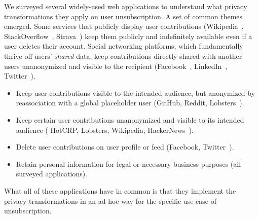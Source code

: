 %
We surveyed several widely-used web applications to understand what privacy transformations they apply on user unsubscription.
%
A set of common themes emerged.
%
Some services that publicly display user contributions (\eg Wikipedia~\cite{wikipedia:privacy},
StackOverflow~\cite{stackoverflow:privacy}, Strava~\cite{strava:privacy}) keep them publicly
and indefinitely available even if a user deletes their account.
%
Social networking platforms, which fundamentally thrive off users' \emph{shared} data, keep
contributions directly shared with another users unanonymized and visible to the recipient
(\eg Facebook~\cite{facebook:privacy}, LinkedIn~\cite{linkedin:privacy},
Twitter~\cite{twitter:privacy}).
%
\begin{itemize}[nosep]
    \item Keep user contributions visible to the intended audience, but anonymized by reassociation with a global
        placeholder user (\eg GitHub, Reddit, Lobsters~\cite{github:privacy, reddit:privacy,
        lobsters:privacy}).
    \item Keep certain user contributions unanonymized and visible to its intended audience (\eg
        HotCRP, Lobsters, Wikipedia, HackerNews~\cite{hotcrp:privacy, lobsters:privacy,
        hackernews:privacy, wikipedia:privacy}).
    \item Delete user contributions on user profile or feed (\eg Facebook,
        Twitter~\cite{facebook:privacy, twitter:privacy}).
    \item Retain personal information for legal or necessary business purposes (all surveyed applications).
\end{itemize}
%
What all of these applications have in common is that they implement the privacy transformations
in an ad-hoc way for the specific use case of unsubscription.
%

